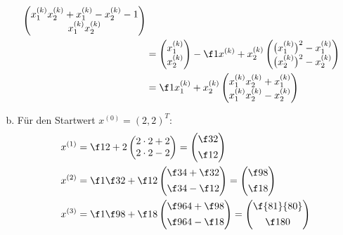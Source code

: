 \documentclass{mywork}
\begin{document}
\begin{aufgabe}
\begin{enumerate}[a)]
\begin{align*}
\begin{pmatrix}
					x_1^{(k)} x_2^{(k)} + x_1^{(k)} - x_2^{(k)} - 1 \\
					x_1^{(k)} x_2^{(k)}
				\end{pmatrix} \\ 
				&= \begin{pmatrix}
					x_1^{(k)} \\ x_2^{(k)}
				\end{pmatrix} - \f 1{x^{(k)} + x_2^{(k)}} \begin{pmatrix}
					\big(x_1^{(k)}\big)^2 - x_1^{(k)} \\
					\big(x_2^{(k)}\big)^2 - x_2^{(k)}
				\end{pmatrix}  \\
				&= \f 1{x_1^{(k)} + x_2^{(k)}} \begin{pmatrix}
					x_1^{(k)} x_2^{(k)} + x_1^{(k)} \\
					x_1^{(k)} x_2^{(k)} - x_2^{(k)} \\
				\end{pmatrix}
			\end{align*}
		\item
			Für den Startwert $x^{(0)} = (2,2)^T$:
			\begin{align*}
				x^{(1)} &= \f 1{2+2} \begin{pmatrix}
					2 \cdot 2 + 2 \\
					2 \cdot 2 - 2
				\end{pmatrix} = \begin{pmatrix}
					\f 32 \\[0.4em]
					\f 12
				\end{pmatrix} \\
				x^{(2)} &= \f 1{\f 32 + \f 12} \begin{pmatrix}
					\f 34 + \f 32 \\[0.4em]
					\f 34 - \f 12
				\end{pmatrix} = \begin{pmatrix}
					\f 98 \\[0.4em]
					\f 18
				\end{pmatrix}\\
				x^{(3)} &= \f 1{\f 98 + \f 18} \begin{pmatrix}
					\f 9{64} + \f 98 \\[0.4em]
					\f 9{64} - \f 18
				\end{pmatrix} = \begin{pmatrix}
					\f {81}{80} \\[0.4em]
					\f 1{80}
				\end{pmatrix}
			\end{align*}

\end{enumerate}
\end{aufgabe}
\end{document}
